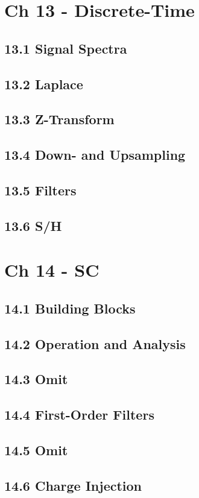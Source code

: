 \documentclass[a4paper,twocolumn]{article}
\begin{document}
  \section{Ch 13 - Discrete-Time}
    \subsection{13.1 Signal Spectra}
    \subsection{13.2 Laplace}
    \subsection{13.3 Z-Transform}
    \subsection{13.4 Down- and Upsampling}
    \subsection{13.5 Filters}
    \subsection{13.6 S/H}
  \section{Ch 14 - SC}
    \subsection{14.1 Building Blocks}
    \subsection{14.2 Operation and Analysis}
    \subsection{14.3 Omit}
    \subsection{14.4 First-Order Filters}
    \subsection{14.5 Omit}
    \subsection{14.6 Charge Injection}
\end{document}
